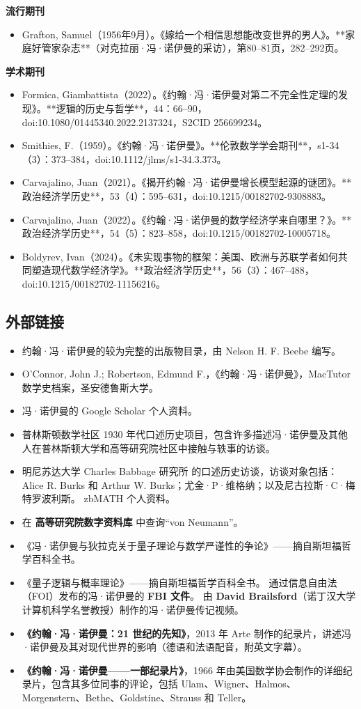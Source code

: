 \textbf{流行期刊}
\begin{itemize}
\item Grafton, Samuel（1956年9月）。《嫁给一个相信思想能改变世界的男人》。**家庭好管家杂志**（对克拉丽·冯·诺伊曼的采访），第80–81页，282–292页。
\end{itemize}
\textbf{学术期刊}
\begin{itemize}
\item Formica, Giambattista（2022）。《约翰·冯·诺伊曼对第二不完全性定理的发现》。**逻辑的历史与哲学**，44：66–90，doi:10.1080/01445340.2022.2137324，S2CID 256699234。  
\item Smithies, F.（1959）。《约翰·冯·诺伊曼》。**伦敦数学学会期刊**，s1-34（3）：373–384，doi:10.1112/jlms/s1-34.3.373。  
\item Carvajalino, Juan（2021）。《揭开约翰·冯·诺伊曼增长模型起源的谜团》。**政治经济学历史**，53（4）：595–631，doi:10.1215/00182702-9308883。  
\item Carvajalino, Juan（2022）。《约翰·冯·诺伊曼的数学经济学来自哪里？》。**政治经济学历史**，54（5）：823–858，doi:10.1215/00182702-10005718。  
\item Boldyrev, Ivan（2024）。《未实现事物的框架：美国、欧洲与苏联学者如何共同塑造现代数学经济学》。**政治经济学历史**，56（3）：467–488，doi:10.1215/00182702-11156216。
\end{itemize}
\subsection{外部链接}
\begin{itemize}
\item 约翰·冯·诺伊曼的较为完整的出版物目录，由 Nelson H. F. Beebe 编写。  
\item O'Connor, John J.; Robertson, Edmund F.，《约翰·冯·诺伊曼》，MacTutor 数学史档案，圣安德鲁斯大学。  
\item 冯·诺伊曼的 Google Scholar 个人资料。  
\item 普林斯顿数学社区 1930 年代口述历史项目，包含许多描述冯·诺伊曼及其他人在普林斯顿大学和高等研究院社区中接触与轶事的访谈。  
\item 明尼苏达大学 Charles Babbage 研究所 的口述历史访谈，访谈对象包括：Alice R. Burks 和 Arthur W. Burks；尤金·P·维格纳；以及尼古拉斯·C·梅特罗波利斯。  
zbMATH 个人资料。  
\item 在 \textbf{高等研究院数字资料库} 中查询“von Neumann”。  
\item 《冯·诺伊曼与狄拉克关于量子理论与数学严谨性的争论》——摘自斯坦福哲学百科全书。  
\item 《量子逻辑与概率理论》——摘自斯坦福哲学百科全书。  
通过信息自由法（FOI）发布的冯·诺伊曼的 \textbf{FBI 文件}。  
由 \textbf{David Brailsford}（诺丁汉大学计算机科学名誉教授）制作的冯·诺伊曼传记视频。  
\item \textbf{《约翰·冯·诺伊曼：21 世纪的先知》}，2013 年 Arte 制作的纪录片，讲述冯·诺伊曼及其对现代世界的影响（德语和法语配音，附英文字幕）。  
\item \textbf{《约翰·冯·诺伊曼——一部纪录片》}，1966 年由美国数学协会制作的详细纪录片，包含其多位同事的评论，包括 Ulam、Wigner、Halmos、Morgenstern、Bethe、Goldstine、Strauss 和 Teller。
\end{itemize}
